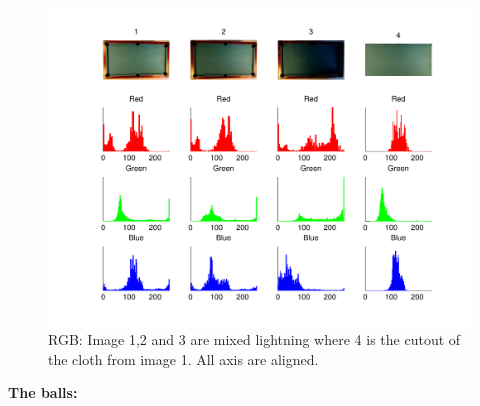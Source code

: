 \begin{figure}[H]
\begin{center}
\leavevmode
\includegraphics[width=1\textwidth]{images/rgb_hist_table}
\end{center}
\caption{RGB: Image 1,2 and 3 are mixed lightning where 4 is the cutout of the cloth from image 1. All axis are aligned.}
\label{fig:tablergb}
\end{figure}

\textbf{The balls:}\\